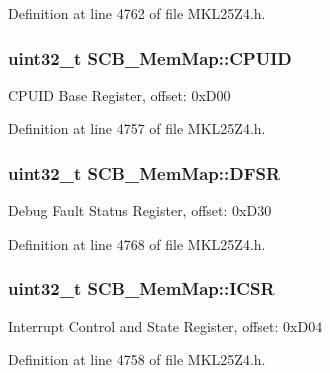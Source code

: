 Definition at line 4762 of file M\+K\+L25\+Z4.\+h.

\subsubsection[{\texorpdfstring{C\+P\+U\+ID}{CPUID}}]{\setlength{\rightskip}{0pt plus 5cm}uint32\+\_\+t S\+C\+B\+\_\+\+Mem\+Map\+::\+C\+P\+U\+ID}\hypertarget{struct_s_c_b___mem_map_ad020795dcc3605b4c828af83df8b8836}{}\label{struct_s_c_b___mem_map_ad020795dcc3605b4c828af83df8b8836}
C\+P\+U\+ID Base Register, offset\+: 0x\+D00 

Definition at line 4757 of file M\+K\+L25\+Z4.\+h.

\subsubsection[{\texorpdfstring{D\+F\+SR}{DFSR}}]{\setlength{\rightskip}{0pt plus 5cm}uint32\+\_\+t S\+C\+B\+\_\+\+Mem\+Map\+::\+D\+F\+SR}\hypertarget{struct_s_c_b___mem_map_af178d6003a18eb7452c51edcec14ec5d}{}\label{struct_s_c_b___mem_map_af178d6003a18eb7452c51edcec14ec5d}
Debug Fault Status Register, offset\+: 0x\+D30 

Definition at line 4768 of file M\+K\+L25\+Z4.\+h.

\subsubsection[{\texorpdfstring{I\+C\+SR}{ICSR}}]{\setlength{\rightskip}{0pt plus 5cm}uint32\+\_\+t S\+C\+B\+\_\+\+Mem\+Map\+::\+I\+C\+SR}\hypertarget{struct_s_c_b___mem_map_aafbaa0d0a4b79969877c9b84be8aaf7a}{}\label{struct_s_c_b___mem_map_aafbaa0d0a4b79969877c9b84be8aaf7a}
Interrupt Control and State Register, offset\+: 0x\+D04 

Definition at line 4758 of file M\+K\+L25\+Z4.\+h.

